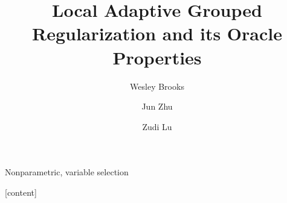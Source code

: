 \documentclass[authoryear,review, 12pt]{elsarticle}
\begin{document}
\begin{frontmatter}

\title{Local Adaptive Grouped Regularization and its Oracle Properties}


\author[wrbrooks]{Wesley Brooks}

\author[jzhu]{Jun Zhu}

\author[zlu]{Zudi Lu}

\address[wrbrooks]{Department of Statistics, University of Wisconsin, Madison, WI 53706}
\address[jzhu]{Department of Statistics and Department of Entomology, University of Wisconsin, Madison, WI 53706}
\address[zlu]{School of Mathematical Sciences, The University of Southampton Highfield, Southampton UK}

\begin{abstract}

\end{abstract}

\begin{keyword}
Nonparametric, variable selection
\end{keyword}

\end{frontmatter}

[content]



\end{document}
